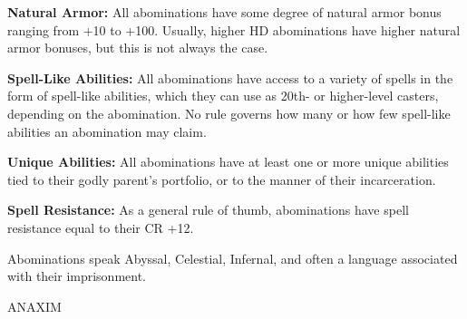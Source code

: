 \documentclass{article}
\begin{document}
\textbf{Natural Armor: }All abominations have some degree of natural armor bonus 
ranging from +10 to +100. Usually, higher HD abominations have higher natural armor 
bonuses, but this is not always the case. 

\textbf{Spell-Like Abilities: }All abominations have access to a variety of spells 
in the form of spell-like abilities, which they can use as 20th- or higher-level 
casters, depending on the abomination. No rule governs how many or how few spell-like 
abilities an abomination may claim. 

\textbf{Unique Abilities: }All abominations have at least one or more unique abilities 
tied to their godly parent's portfolio, or to the manner of their incarceration. 

\textbf{Spell Resistance: }As a general rule of thumb, abominations have spell 
resistance equal to their CR +12. 

\vspace{12pt}
Abominations speak Abyssal, Celestial, Infernal, and often a language associated 
with their imprisonment. 

{\LARGE{}ANAXIM}
\end{document}
